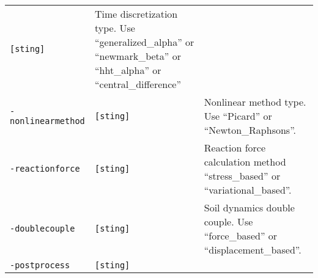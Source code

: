 \begin{longtable}[]{@{}lll@{}}
\begin{minipage}[t]{0.09\columnwidth}
\lstinline![sting]!\strut
\end{minipage} & \begin{minipage}[t]{0.56\columnwidth}\raggedright\strut
Time discretization type. Use ``generalized\_alpha'' or
``newmark\_beta'' or ``hht\_alpha'' or ``central\_difference''\strut
\end{minipage}\tabularnewline
\begin{minipage}[t]{0.26\columnwidth}\raggedright\strut
\lstinline!-nonlinearmethod!\strut
\end{minipage} & \begin{minipage}[t]{0.09\columnwidth}\raggedright\strut
\lstinline![sting]!\strut
\end{minipage} & \begin{minipage}[t]{0.56\columnwidth}\raggedright\strut
Nonlinear method type. Use ``Picard'' or ``Newton\_Raphsons''.\strut
\end{minipage}\tabularnewline
\begin{minipage}[t]{0.26\columnwidth}\raggedright\strut
\lstinline!-reactionforce!\strut
\end{minipage} & \begin{minipage}[t]{0.09\columnwidth}\raggedright\strut
\lstinline![sting]!\strut
\end{minipage} & \begin{minipage}[t]{0.56\columnwidth}\raggedright\strut
Reaction force calculation method ``stress\_based'' or
``variational\_based''.\strut
\end{minipage}\tabularnewline
\begin{minipage}[t]{0.26\columnwidth}\raggedright\strut
\lstinline!-doublecouple!\strut
\end{minipage} & \begin{minipage}[t]{0.09\columnwidth}\raggedright\strut
\lstinline![sting]!\strut
\end{minipage} & \begin{minipage}[t]{0.56\columnwidth}\raggedright\strut
Soil dynamics double couple. Use ``force\_based'' or
``displacement\_based''.\strut
\end{minipage}\tabularnewline
\begin{minipage}[t]{0.26\columnwidth}\raggedright\strut
\lstinline!-postprocess!\strut
\end{minipage} & \begin{minipage}[t]{0.09\columnwidth}\raggedright\strut
\lstinline![sting]!\strut
\end{minipage} & \begin{minipage}[t]{0.56\columnwidth}\raggedright\strut

\end{minipage}
\end{longtable}
